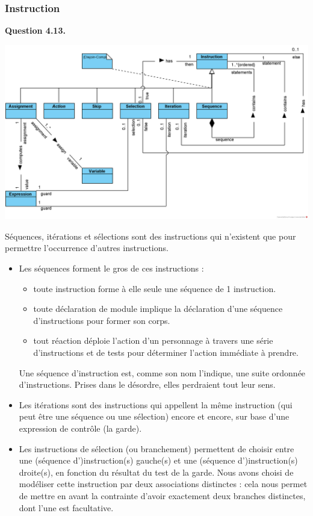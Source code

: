\documentclass[oneside,a4paper]{book}
\begin{document}
\subsubsection{Instruction}

\textbf{Question 4.13.}\label{Question 4.13.}\newline

\nopagebreak 

\includegraphics[width=\textwidth,height=\textheight,keepaspectratio]{Diagrams/DS-Instruction.png}

Séquences, itérations et sélections sont des instructions qui n'existent que pour permettre l'occurrence d'autres instructions. 
\begin{itemize}
    \item Les séquences forment le gros de ces instructions : 
    \begin{itemize}
        \item toute instruction forme à elle seule une séquence de 1 instruction.
        \item toute déclaration de module implique la déclaration d'une séquence d'instructions pour former son corps.
        \item tout réaction déploie l'action d'un personnage à travers une série d'instructions et de tests pour déterminer l'action immédiate à prendre. 
    \end{itemize}
    Une séquence d'instruction est, comme son nom l'indique, une suite ordonnée d'instructions. Prises dans le désordre, elles perdraient tout leur sens.
    \item Les itérations sont des instructions qui appellent la même instruction (qui peut être une séquence ou une sélection) encore et encore, sur base d'une expression de contrôle (la garde).
    \item Les instructions de sélection (ou branchement) permettent de choisir entre une (séquence d')instruction(s) gauche(s) et une (séquence d')instruction(s) droite(s), en fonction du résultat du test de la garde. Nous avons choisi de modéliser cette instruction par deux associations distinctes : cela nous permet de mettre en avant la contrainte d'avoir exactement deux branches distinctes, dont l'une est facultative.
\end{itemize}
\end{document}
